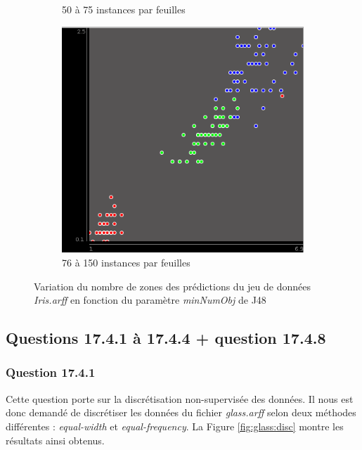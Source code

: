 \documentclass[10pt,a4paper]{article}
\begin{document}
\begin{figure}[!]
\begin{subfigure}{.333\textwidth}
		   			\caption{50 à 75 instances par feuilles}
		   		\end{subfigure}%
		   		\begin{subfigure}{.333\textwidth}
		   			\centering
		   			\includegraphics[width=.9\textwidth]{iris_J48_1zone}
		   			\caption{76 à 150 instances par feuilles}
		   		\end{subfigure}
		   		
		   		\caption{Variation du nombre de zones des prédictions du jeu de données \textit{Iris.arff} en fonction du paramètre \textit{minNumObj} de J48}
		   		\label{fig:iris:J48:zones}
		   	\end{figure}
		   	
		\subsection{Questions 17.4.1 à 17.4.4 + question 17.4.8}
		
			\subsubsection*{Question 17.4.1}
			
			Cette question porte sur la discrétisation non-supervisée des données. Il nous est donc demandé de discrétiser les données du fichier \textit{glass.arff} selon deux méthodes différentes : \textit{equal-width} et \textit{equal-frequency}. La Figure \ref{fig:glass:disc} montre les résultats ainsi obtenus.\\
			
\end{document}
